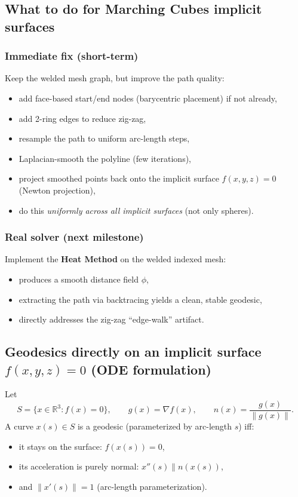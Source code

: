 \documentclass[12pt,a4paper]{article}
\newcommand{\R}{\mathbb{R}}
\theoremstyle{plain}
\theoremstyle{definition}
\begin{document}
	\subsection{What to do for Marching Cubes implicit surfaces}
	
		\subsubsection*{Immediate fix (short-term)}
	Keep the welded mesh graph, but improve the path quality:
	\begin{itemize}
		\item add face-based start/end nodes (barycentric placement) if not already,
		\item add 2-ring edges to reduce zig-zag,
		\item resample the path to uniform arc-length steps,
		\item Laplacian-smooth the polyline (few iterations),
		\item project smoothed points back onto the implicit surface $f(x,y,z)=0$ (Newton projection),
		\item do this \emph{uniformly across all implicit surfaces} (not only spheres).
	\end{itemize}
	
		\subsubsection*{Real solver (next milestone)}
	Implement the \textbf{Heat Method} on the welded indexed mesh:
	\begin{itemize}
		\item produces a smooth distance field $\phi$,
		\item extracting the path via backtracing yields a clean, stable geodesic,
		\item directly addresses the zig-zag ``edge-walk'' artifact.
	\end{itemize}
	
	\subsection{Geodesics directly on an implicit surface $f(x,y,z)=0$ (ODE formulation)}
	Let
	\[
	S = \{x\in\R^3 : f(x)=0\},\qquad g(x)=\nabla f(x),\qquad n(x)=\frac{g(x)}{\|g(x)\|}.
	\]
	A curve $x(s)\in S$ is a geodesic (parameterized by arc-length $s$) iff:
	\begin{itemize}
		\item it stays on the surface: $f(x(s))=0$,
		\item its acceleration is purely normal: $x''(s) \parallel n(x(s))$,
		\item and $\|x'(s)\|=1$ (arc-length parameterization).
	\end{itemize}
	
\end{document}
